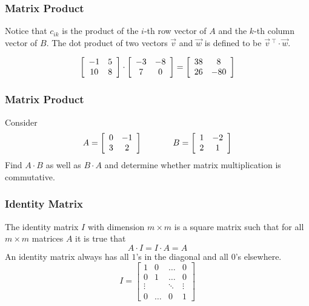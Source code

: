 \documentclass[xcolor=dvipsnames]{beamer}
\begin{document}
\begin{frame}
  \frametitle{Matrix Product}
  Notice that $c_{ik}$ is the product of the $i$-th row vector of $A$
  and the $k$-th column vector of $B$. The dot product of two vectors
  $\vec{v}$ and $\vec{w}$ is defined to be
  $\vec{v}\,^{\intercal}\cdot\vec{w}$.

\medskip

  \begin{equation}
    \label{eq:eroogaju}
    \left[
      \begin{array}{cc}
        -1 & 5 \\
        10 & 8 
      \end{array}\right]\cdot\left[
      \begin{array}{cc}
        -3 & -8 \\
        7 & 0
      \end{array}\right]=\left[
      \begin{array}{cc}
        38 & 8 \\
        26 & -80
      \end{array}\right]\notag
  \end{equation}
\end{frame}

\begin{frame}
  \frametitle{Matrix Product}
  {\ubung} Consider
  \begin{equation}
    \label{eq:tiequooh}
    A=\left[
      \begin{array}{cc}
        0 & -1 \\
        3 & 2
      \end{array}\right]\hspace{.5in}B=\left[
      \begin{array}{cc}
        1 & -2 \\
        2 & 1
      \end{array}\right]
  \end{equation}
Find $A\cdot{}B$ as well as $B\cdot{}A$ and determine whether matrix
multiplication is commutative.
\end{frame}

\begin{frame}
  \frametitle{Identity Matrix}
The \alert{identity matrix} $I$ with dimension $m\times{}m$ is a square matrix
such that for all $m\times{}m$ matrices $A$ it is true that
\begin{equation}
  \label{eq:aivaitoa}
  A\cdot{}I=I\cdot{}A=A
\end{equation}
An identity matrix always has all $1$'s in the diagonal and all $0$'s
elsewhere.
\begin{equation}
  \label{eq:ubaisula}
  I=\left[
    \begin{array}{cccc}
      1 & 0 & \ldots & 0 \\
      0 & 1 & \ldots & 0 \\
      \vdots & & \ddots & \vdots \\
      0 & \ldots & 0 & 1
    \end{array}\right]
\end{equation}
\end{frame}
\end{document}
